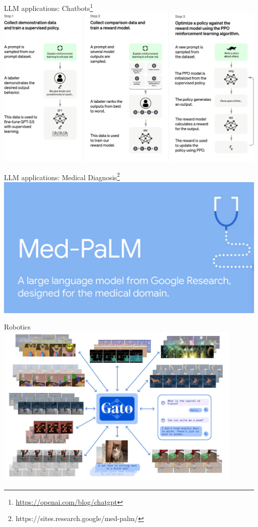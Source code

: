 \documentclass[presentation, 10pt]{beamer}\mode<presentation>{\usetheme{AMSBolognaFC}}
\begin{document}
\begin{frame}{LLM applications: Chatbots\footnote{\url{https://openai.com/blog/chatgpt}}}
\includegraphics[width=\textwidth]{img/image.pdf}
\end{frame}
\begin{frame}{LLM applications: Medical Diagnosis\footnote{https://sites.research.google/med-palm/}}
\includegraphics[width=\textwidth]{img/palm-med.png}
\end{frame}
\begin{frame}{Robotics~\cite{DBLP:journals/corr/abs-2205-06175}}
	\centering
	\includegraphics[width=0.9\textwidth]{img/generalistic-agent.jpeg}
\end{frame}
\end{document}
